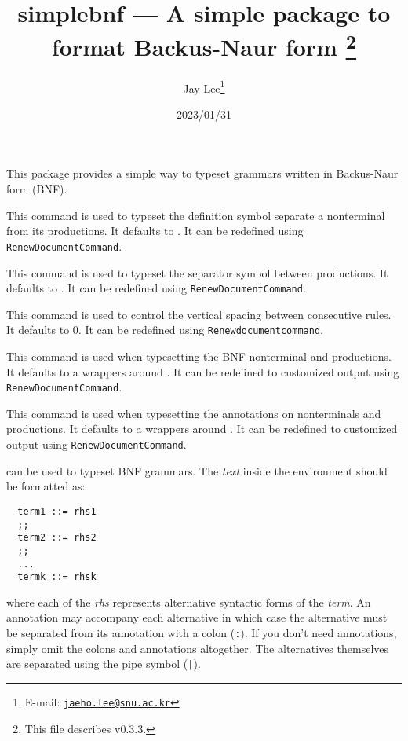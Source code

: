 \documentclass[a4paper]{article}
\title{%
  \textsf{simplebnf} --- A simple package to format Backus-Naur form%
  \footnote{This file describes v0.3.3.}}
\author{Jay Lee\footnote{E-mail: %
  \href{mailto:jaeho.lee@snu.ac.kr}{\texttt{jaeho.lee@snu.ac.kr}}}}
\date{2023/01/31}
\begin{document}
\maketitle

This package provides a simple way to typeset grammars written in Backus-Naur form (BNF).

\begin{presentcommand}
\end{presentcommand}
This command is used to typeset the definition symbol separate a nonterminal from its productions. It defaults to \SimpleBNFDefEq. It can be redefined using \verb|RenewDocumentCommand|.

\begin{presentcommand}
\end{presentcommand}
This command is used to typeset the separator symbol between productions. It defaults to \SimpleBNFDefOr. It can be redefined using \verb|RenewDocumentCommand|.

\begin{presentcommand}
\end{presentcommand}
This command is used to control the vertical spacing between consecutive rules.
It defaults to 0.
It can be redefined using \verb/Renewdocumentcommand/.

\begin{presentcommand}
\end{presentcommand}
This command is used when typesetting the BNF nonterminal and productions. It defaults to a wrappers around . It can be redefined to customized output using \verb|RenewDocumentCommand|.

\begin{presentcommand}
\end{presentcommand}
This command is used when typesetting the annotations on nonterminals and productions. It defaults to a wrappers around . It can be redefined to customized output using \verb|RenewDocumentCommand|.

\begin{presentcommand}
\end{presentcommand}
can be used to typeset BNF grammars. The \textit{text} inside the environment should be formatted as:
\begin{verbatim}
  term1 ::= rhs1
  ;;
  term2 ::= rhs2
  ;;
  ...
  termk ::= rhsk
\end{verbatim}
where each of the \textit{rhs} represents alternative syntactic forms of the \textit{term}. An annotation may accompany each alternative in which case the alternative must be separated from its annotation with a colon (\verb/:/). If you don't need annotations, simply omit the colons and annotations altogether. The alternatives themselves are separated using the pipe symbol (\verb/|/).
\end{document}
